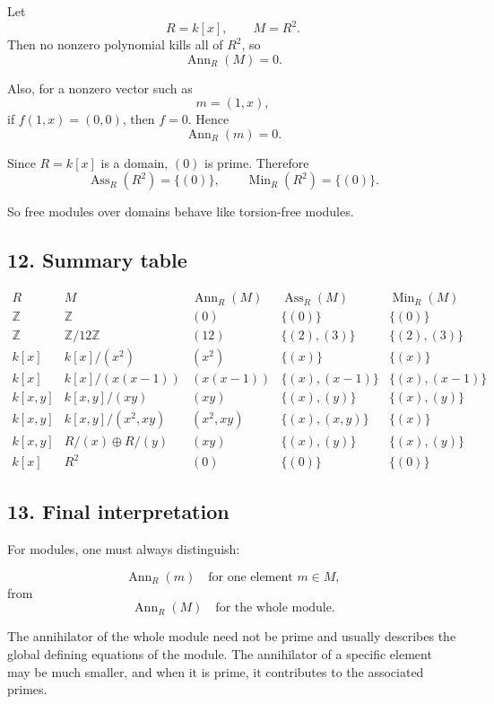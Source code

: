 \documentclass[12pt,a4paper,oneside]{report}
\DeclareMathOperator{\Ass}{Ass}
\DeclareMathOperator{\Ann}{Ann}
\DeclareMathOperator{\Min}{Min}
\theoremstyle{notespace}
\begin{document}
	Let
	\[
	R=k[x],\qquad M=R^2.
	\]
	Then no nonzero polynomial kills all of \(R^2\), so
	\[
	\Ann_R(M)=0.
	\]
	
	Also, for a nonzero vector such as
	\[
	m=(1,x),
	\]
	if \(f(1,x)=(0,0)\), then \(f=0\). Hence
	\[
	\Ann_R(m)=0.
	\]
	
	Since \(R=k[x]\) is a domain, \((0)\) is prime. Therefore
	\[
	\Ass_R(R^2)=\{(0)\},
	\qquad
	\Min_R(R^2)=\{(0)\}.
	\]
	
	So free modules over domains behave like torsion-free modules.
	
	\subsection{12. Summary table}
	
	\[
	\begin{array}{c|c|c|c|c}
		R & M & \Ann_R(M) & \Ass_R(M) & \Min_R(M)\\
		\hline
		\mathbb Z & \mathbb Z & (0) & \{(0)\} & \{(0)\}\\[4pt]
		\mathbb Z & \mathbb Z/12\mathbb Z & (12) & \{(2),(3)\} & \{(2),(3)\}\\[4pt]
		k[x] & k[x]/(x^2) & (x^2) & \{(x)\} & \{(x)\}\\[4pt]
		k[x] & k[x]/(x(x-1)) & (x(x-1)) & \{(x),(x-1)\} & \{(x),(x-1)\}\\[4pt]
		k[x,y] & k[x,y]/(xy) & (xy) & \{(x),(y)\} & \{(x),(y)\}\\[4pt]
		k[x,y] & k[x,y]/(x^2,xy) & (x^2,xy) & \{(x),(x,y)\} & \{(x)\}\\[4pt]
		k[x,y] & R/(x)\oplus R/(y) & (xy) & \{(x),(y)\} & \{(x),(y)\}\\[4pt]
		k[x] & R^2 & (0) & \{(0)\} & \{(0)\}
	\end{array}
	\]
	
	\subsection{13. Final interpretation}
	
	For modules, one must always distinguish:
	
	\[
	\Ann_R(m)
	\quad\text{for one element }m\in M,
	\]
	from
	\[
	\Ann_R(M)
	\quad\text{for the whole module.}
	\]
	
	The annihilator of the whole module need not be prime and usually describes the global defining equations of the module. The annihilator of a specific element may be much smaller, and when it is prime, it contributes to the associated primes.
	
\end{document}
